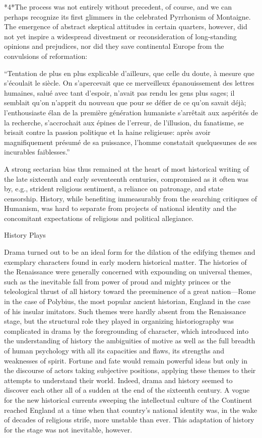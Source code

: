 *4*The process was not entirely without precedent, of course, and we can perhaps recognize its first glimmers in the celebrated Pyrrhonism of Montaigne. The emergence of abstract skeptical attitudes in certain quarters, however, did not yet inspire a widespread divestment or reconsideration of long-standing opinions and prejudices, nor did they save continental Europe from the convulsions of reformation:
\begin{bq}
``Tentation de plus en plus explicable d'ailleurs, que celle du doute, à mesure que s'écoulait le siècle. On s'apercevait que ce merveilleux épanouissement des lettres humaines, salué avec tant d'espoir, n'avait pas rendu les gens plus sages; il semblait qu'on n'apprit du nouveau que pour se défier de ce qu'on savait déjà; l'enthousiaste élan de la première génération humaniste s'arrêtait aux aspérités de la recherche, s'accrochait aux épines de l'erreur, de l'illusion, du fanatisme, se brisait contre la passion politique et la haine religieuse: après avoir magnifiquement présumé de sa puissance, l'homme constatait quelquesunes de ses incurables faiblesses.''~\cite[45]{pintard_libertinage_2000}
\end{bq}
A strong sectarian bias thus remained at the heart of most historical writing of the late sixteenth and early seventeenth centuries, compromised as it often was by, e.g., strident religious sentiment, a reliance on patronage, and state censorship. History, while benefiting immeasurably from the searching critiques of Humanism, was hard to separate from projects of national identity and the concomitant expectations of religious and political allegiance.

History Plays

Drama turned out to be an ideal form for the dilation of the edifying themes and exemplary characters found in early modern historical matter. The histories of the Renaissance were generally concerned with expounding on universal themes, such as the inevitable fall from power of proud and mighty princes or the teleological thrust of all history toward the preeminence of a great nation---Rome in the case of Polybius, the most popular ancient historian, England in the case of his insular imitators. Such themes were hardly absent from the Renaissance stage, but the structural role they played in organizing historiography was complicated in drama by the foregrounding of character, which introduced into the understanding of history the ambiguities of motive as well as the full breadth of human psychology with all its capacities and flaws, its strengths and weaknesses of spirit. Fortune and fate would remain powerful ideas but only in the discourse of actors taking subjective positions, applying these themes to their attempts to understand their world. Indeed, drama and history seemed to discover each other all of a sudden at the end of the sixteenth century. A vogue for the new historical currents sweeping the intellectual culture of the Continent reached England at a time when that country's national identity was, in the wake of decades of religious strife, more unstable than ever. This adaptation of history for the stage was not inevitable, however.

